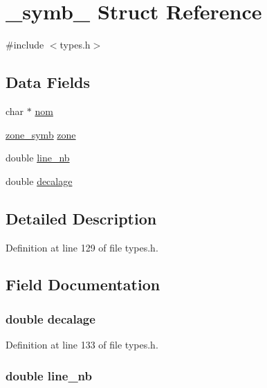 \hypertarget{struct__symb__}{\section{\-\_\-symb\-\_\- Struct Reference}
\label{struct__symb__}
}


{\ttfamily \#include $<$types.\-h$>$}

\subsection*{Data Fields}
\begin{DoxyCompactItemize}
\item 
char $\ast$ \hyperlink{struct__symb___abe308d273ff51ad86ff02ef3ba3b6f0e}{nom}
\item 
\hyperlink{types_8h_a706120c40630aa23c560dd0144b0f2c0}{zone\-\_\-symb} \hyperlink{struct__symb___a6a70ab3aecc26de50260bd4e04c43c9b}{zone}
\item 
double \hyperlink{struct__symb___a808a37180ef5a21555b2f0f68cf73cb6}{line\-\_\-nb}
\item 
double \hyperlink{struct__symb___aac945295366b3dadfd1ec0da01eb6cb8}{decalage}
\end{DoxyCompactItemize}


\subsection{Detailed Description}


Definition at line 129 of file types.\-h.



\subsection{Field Documentation}
\hypertarget{struct__symb___aac945295366b3dadfd1ec0da01eb6cb8}{
\subsubsection[{decalage}]{\setlength{\rightskip}{0pt plus 5cm}double decalage}}\label{struct__symb___aac945295366b3dadfd1ec0da01eb6cb8}


Definition at line 133 of file types.\-h.

\hypertarget{struct__symb___a808a37180ef5a21555b2f0f68cf73cb6}{
\subsubsection[{line\-\_\-nb}]{\setlength{\rightskip}{0pt plus 5cm}double line\-\_\-nb}}\label{struct__symb___a808a37180ef5a21555b2f0f68cf73cb6}


